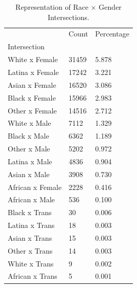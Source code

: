 \begin{table}[htbp]
\centering
\caption{Representation of Race × Gender Intersections.}
\label{tab:eda_intersections}
\begin{tabular}{lll}
\toprule
 & Count & Percentage \\
Intersection &  &  \\
\midrule
White x Female & 31459 & 5.878 \\
Latina x Female & 17242 & 3.221 \\
Asian x Female & 16520 & 3.086 \\
Black x Female & 15966 & 2.983 \\
Other x Female & 14516 & 2.712 \\
White x Male & 7112 & 1.329 \\
Black x Male & 6362 & 1.189 \\
Other x Male & 5202 & 0.972 \\
Latina x Male & 4836 & 0.904 \\
Asian x Male & 3908 & 0.730 \\
African x Female & 2228 & 0.416 \\
African x Male & 536 & 0.100 \\
Black x Trans & 30 & 0.006 \\
Latina x Trans & 18 & 0.003 \\
Asian x Trans & 15 & 0.003 \\
Other x Trans & 14 & 0.003 \\
White x Trans & 9 & 0.002 \\
African x Trans & 5 & 0.001 \\
\bottomrule
\end{tabular}

\end{table}